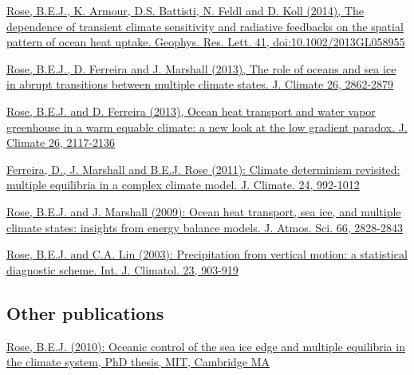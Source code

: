\documentclass[11pt, letterpaper]{article} %
\newcommand{\years}[1]{\marginnote{\scriptsize #1}} %
\newcommand{\publink}{http://www.atmos.albany.edu/facstaff/brose/resources/Publications/}
\begin{document}
\years{2014}  
\href{\publink Rose_etal_GRL2014.pdf}{\underline{Rose, B.E.J.}, K. Armour, D.S. Battisti, N. Feldl and D. Koll (2014), The dependence of transient climate sensitivity and radiative feedbacks on the spatial pattern of ocean heat uptake. Geophys. Res. Lett. 41, doi:10.1002/2013GL058955}
  
 
\years{2013}  
\href{\publink Rose_etal_transitions_JClim2013.pdf}{\underline{Rose, B.E.J.}, D. Ferreira and J. Marshall (2013), The role of oceans and sea ice in abrupt transitions between multiple climate states. J. Climate 26, 2862-2879}
\vspace{0.2 cm}

\href{\publink Rose_Ferreira_JClim2013.pdf}{\underline{Rose, B.E.J.} and D. Ferreira (2013), Ocean heat transport and water vapor greenhouse in a warm equable climate: a new look at the low gradient paradox. J. Climate 26, 2117-2136}
\vspace{0.2 cm}

\years{2011}  
\href{\publink FMR_JClim2011_MultipleEq.pdf}{Ferreira, D., J. Marshall and \underline{B.E.J. Rose} (2011): Climate determinism revisited: multiple equilibria in a complex climate model. J. Climate. 24, 992-1012}
\vspace{0.2 cm}
  
\years{2009}  
\href{\publink Rose_Marshall_JAS2009.pdf}{\underline{Rose, B.E.J.} and J. Marshall (2009): Ocean heat transport, sea ice, and multiple climate states: insights from energy balance models. J. Atmos. Sci. 66, 2828-2843}
\vspace{0.2 cm}
  
\years{2003}  
\href{\publink Rose_Lin_2003.pdf}{\underline{Rose, B.E.J.} and C.A. Lin (2003): Precipitation from vertical motion: a statistical diagnostic scheme. Int. J. Climatol. 23, 903-919}


\subsection*{Other publications}
\years{2010}  
\href{\publink Rose_PhD_2010.pdf}{\underline{Rose, B.E.J.} (2010): Oceanic control of the sea ice edge and multiple equilibria in the climate system, PhD thesis, MIT, Cambridge MA}
\vspace{0.2 cm}
\end{document}

